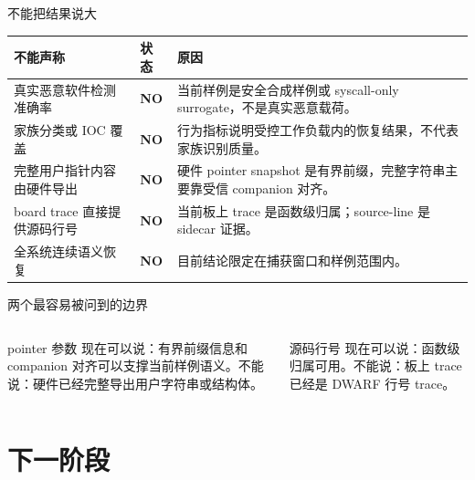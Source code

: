 \documentclass[aspectratio=169,10pt]{beamer}
\newcommand{\nope}[1]{\textcolor{rvred}{\textbf{#1}}}
\begin{document}
\begin{frame}{不能把结果说大}
  \vskip0.05cm
  \begin{center}\scriptsize
  \renewcommand{\arraystretch}{1.18}
  \begin{tabularx}{0.96\linewidth}{@{}L{3.6cm}L{1.5cm}Y@{}}
    \toprule
    \textbf{不能声称} & \textbf{状态} & \textbf{原因} \\
    \midrule
    真实恶意软件检测准确率 & \nope{NO} & 当前样例是安全合成样例或 syscall-only surrogate，不是真实恶意载荷。 \\
    家族分类或 IOC 覆盖 & \nope{NO} & 行为指标说明受控工作负载内的恢复结果，不代表家族识别质量。 \\
    完整用户指针内容由硬件导出 & \nope{NO} & 硬件 pointer snapshot 是有界前缀，完整字符串主要靠受信 companion 对齐。 \\
    board trace 直接提供源码行号 & \nope{NO} & 当前板上 trace 是函数级归属；source-line 是 sidecar 证据。 \\
    全系统连续语义恢复 & \nope{NO} & 目前结论限定在捕获窗口和样例范围内。 \\
    \bottomrule
  \end{tabularx}
  \end{center}
  \vskip0.08cm
\end{frame}

\begin{frame}{两个最容易被问到的边界}
  \vskip0.1cm
  \begin{columns}[T,onlytextwidth]
    \begin{block}{pointer 参数}
      现在可以说：有界前缀信息和 companion 对齐可以支撑当前样例语义。不能说：硬件已经完整导出用户字符串或结构体。
    \end{block}
    \begin{block}{源码行号}
      现在可以说：函数级归属可用。不能说：板上 trace 已经是 DWARF 行号 trace。
    \end{block}
  \end{columns}
  \vskip0.25cm
\end{frame}

\section{下一阶段}
\end{document}
